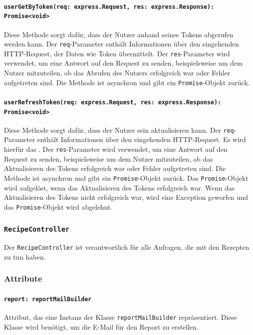 \documentclass{entwurfsheft}
\begin{document}
\begin{sloppypar}
\paragraph{\texttt{userGetByToken(req: express.Request, res: express.Response): Promise<void>
\\}}
Diese Methode sorgt dafür, dass der Nutzer anhand seines Tokens abgerufen werden kann. Der \texttt{req}-Parameter enthält Informationen über den eingehenden HTTP-Request, der Daten wie Token übermittelt. Der \texttt{res}-Parameter wird verwendet, um eine Antwort auf den Request zu senden, beispielsweise um dem Nutzer mitzuteilen, ob das Abrufen des Nutzers erfolgreich war oder Fehler aufgetreten sind. Die Methode ist asynchron und gibt ein \texttt{Promise}-Objekt zurück.
\paragraph{\texttt{userRefreshToken(req: express.Request, res: express.Response): Promise<void>\\}}
Diese Methode sorgt dafür, dass der Nutzer sein \texttt{} aktualisieren kann. Der \texttt{req}-Parameter enthält Informationen über den eingehenden HTTP-Request. Es wird hierfür das \texttt{}. Der \texttt{res}-Parameter wird verwendet, um eine Antwort auf den Request zu senden, beispielsweise um dem Nutzer mitzuteilen, ob das Aktualisieren des Tokens erfolgreich war oder Fehler aufgetreten sind. Die Methode ist asynchron und gibt ein \texttt{Promise}-Objekt zurück. Das \texttt{Promise}-Objekt wird aufgelöst, wenn das Aktualisieren des Tokens erfolgreich war. Wenn das Aktualisieren des Tokens nicht erfolgreich war, wird eine Exception geworfen und das \texttt{Promise}-Objekt wird abgelehnt.

\subsubsection{\texttt{RecipeController}}\label{sec:RecipeController}
Der \texttt{RecipeController} ist verantwortlich für alle Anfragen, die mit den Rezepten zu tun haben.
\subsubsection*{Attribute}
\paragraph{\texttt{report: reportMailBuilder}}
Attribut, das eine Instanz der Klasse \texttt{reportMailBuilder} repräsentiert. Diese Klasse wird benötigt, um die E-Mail für den Report zu erstellen.

\end{sloppypar}
\end{document}
